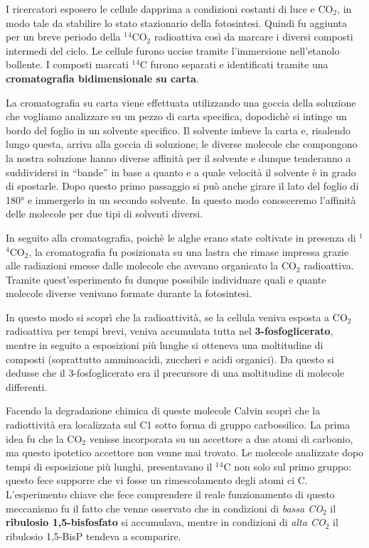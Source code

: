\documentclass[]{article}
\begin{document}
I ricercatori esposero le cellule dapprima a condizioni costanti di luce
e CO$_2$, in modo tale da stabilire lo stato stazionario della
fotosintesi. Quindi fu aggiunta per un breve periodo della
$^1$$^4$CO$_2$ radioattiva così da marcare i diversi composti intermedi
del ciclo. Le cellule furono uccise tramite l'immersione nell'etanolo
bollente. I composti marcati $^1$$^4$C furono separati e identificati
tramite una \textbf{cromatografia bidimensionale su carta}.

La cromatografia su carta viene effettuata utilizzando una goccia della
soluzione che vogliamo analizzare su un pezzo di carta specifica,
dopodichè si intinge un bordo del foglio in un solvente specifico. Il
solvente imbeve la carta e, risalendo lungo questa, arriva alla goccia
di soluzione; le diverse molecole che compongono la nostra soluzione
hanno diverse affinità per il solvente e dunque tenderanno a
suddividersi in ``bande'' in base a quanto e a quale velocità il
solvente è in grado di spostarle. Dopo questo primo passaggio si può
anche girare il lato del foglio di 180° e immergerlo in un secondo
solvente. In questo modo conosceremo l'affinità delle molecole per due
tipi di solventi diversi.

In seguito alla cromatografia, poichè le alghe erano state coltivate in
presenza di $^1$$^4$CO$_2$, la cromatografia fu posizionata su una
lastra che rimase impressa grazie alle radiazioni emesse dalle molecole
che avevano organicato la CO$_2$ radioattiva. Tramite quest'esperimento
fu dunque possibile individuare quali e quante molecole diverse venivano
formate durante la fotosintesi.

In questo modo si scoprì che la radioattività, se la cellula veniva
esposta a CO$_2$ radioattiva per tempi brevi, veniva accumulata tutta
nel \textbf{3-fosfoglicerato}, mentre in seguito a esposizioni più
lunghe si otteneva una moltitudine di composti (soprattutto amminoacidi,
zuccheri e acidi organici). Da questo si dedusse che il 3-fosfoglicerato
era il precursore di una moltitudine di molecole differenti.

Facendo la degradazione chimica di queste molecole Calvin scoprì che la
radiottività era localizzata sul C1 sotto forma di gruppo carbossilico.
La prima idea fu che la CO$_2$ venisse incorporata su un accettore a due
atomi di carbonio, ma questo ipotetico accettore non venne mai trovato.
Le molecole analizzate dopo tempi di esposizione più lunghi,
presentavano il $^1$$^4$C non solo sul primo gruppo: questo fece
supporre che vi fosse un rimescolamento degli atomi ci C. L'esperimento
chiave che fece comprendere il reale funzionamento di questo meccanismo
fu il fatto che venne osservato che in condizioni di \emph{bassa CO$_2$}
il \textbf{ribulosio 1,5-bisfosfato} si accumulava, mentre in condizioni
di \emph{alta CO$_2$} il ribulosio 1,5-BisP tendeva a scomparire.
\end{document}

